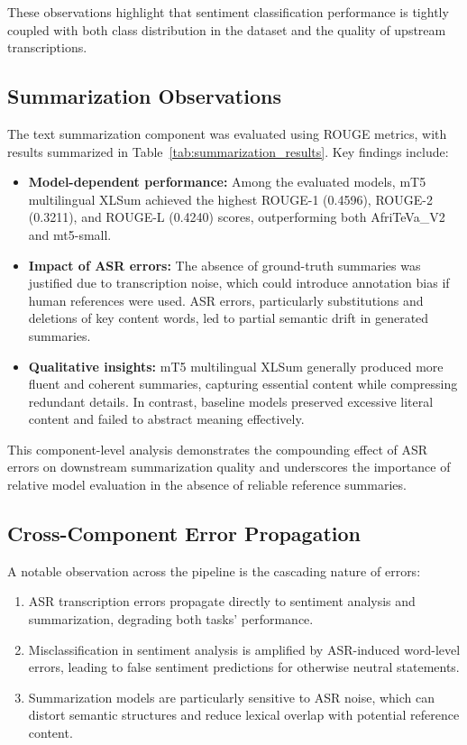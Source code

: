 These observations highlight that sentiment classification performance is tightly coupled with both class distribution in the dataset and the quality of upstream transcriptions.

\subsection{Summarization Observations}

The text summarization component was evaluated using ROUGE metrics, with results summarized in Table~\ref{tab:summarization_results}. Key findings include:

\begin{itemize}
    \item \textbf{Model-dependent performance:} Among the evaluated models, mT5 multilingual XLSum achieved the highest ROUGE-1 (0.4596), ROUGE-2 (0.3211), and ROUGE-L (0.4240) scores, outperforming both AfriTeVa\_V2 and mt5-small.
    \item \textbf{Impact of ASR errors:} The absence of ground-truth summaries was justified due to transcription noise, which could introduce annotation bias if human references were used. ASR errors, particularly substitutions and deletions of key content words, led to partial semantic drift in generated summaries.
    \item \textbf{Qualitative insights:} mT5 multilingual XLSum generally produced more fluent and coherent summaries, capturing essential content while compressing redundant details. In contrast, baseline models preserved excessive literal content and failed to abstract meaning effectively.
\end{itemize}

This component-level analysis demonstrates the compounding effect of ASR errors on downstream summarization quality and underscores the importance of relative model evaluation in the absence of reliable reference summaries.

\subsection{Cross-Component Error Propagation}

A notable observation across the pipeline is the cascading nature of errors:

\begin{enumerate}
    \item ASR transcription errors propagate directly to sentiment analysis and summarization, degrading both tasks' performance.
    \item Misclassification in sentiment analysis is amplified by ASR-induced word-level errors, leading to false sentiment predictions for otherwise neutral statements.
    \item Summarization models are particularly sensitive to ASR noise, which can distort semantic structures and reduce lexical overlap with potential reference content.
\end{enumerate}


